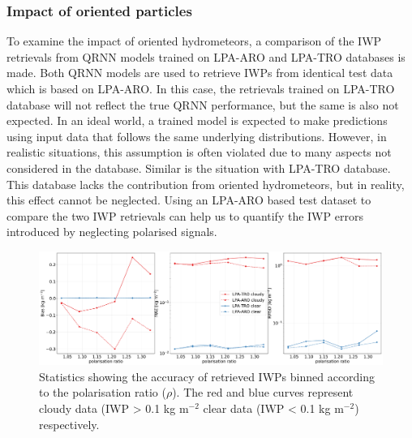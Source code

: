 \documentclass[amt, manuscript]{copernicus}
\begin{document}
 

\subsubsection{Impact of oriented particles}
\label{sec:impact_retrieval}
%
To examine the impact of oriented hydrometeors, a comparison of the IWP retrievals from QRNN models trained on LPA-ARO and LPA-TRO databases is made. Both QRNN models are used to retrieve IWPs from identical test data which is based on LPA-ARO. In this case, the retrievals trained on LPA-TRO database will not reflect the true QRNN performance, but the same is also not expected. In an ideal world, a trained model is expected to make predictions using input data that follows the same underlying distributions. However, in realistic situations, this assumption is often violated due to many aspects not considered in the database. Similar is the situation with LPA-TRO database. This database lacks the contribution from oriented hydrometeors, but in reality, this effect cannot be neglected. Using an LPA-ARO based test dataset to compare the two IWP retrievals can help us to quantify the IWP errors introduced by neglecting polarised signals. 


\begin{figure}[t]
	\includegraphics[width=12cm]{Figures/statistics_cloudyclear.pdf}
	\caption{Statistics showing the accuracy of retrieved IWPs
		binned according to the polarisation ratio ($\rho$). The red and blue curves represent cloudy data (IWP > 0.1\,\,kg m$^{-2}$
		clear data (IWP < 0.1\,\,kg m$^{-2}$) respectively.}
	\label{fig:clear_cloudy}
\end{figure}
\end{document}

